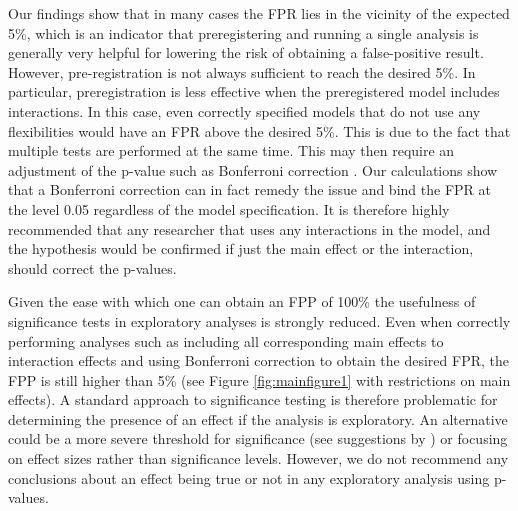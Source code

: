 Our findings show that in many cases the FPR lies in the vicinity of the expected 5\%, which is an indicator that preregistering and running a single analysis is generally very helpful for lowering the risk of obtaining a false-positive result. However, pre-registration is not always sufficient to reach the desired 5\%. In particular, preregistration is less effective when the preregistered model includes interactions. In this case, even correctly specified models that do not use any flexibilities would have an FPR above the desired 5\%. This is due to the fact that multiple tests are performed at the same time. This may then require an adjustment of the p-value such as Bonferroni correction \citep{dunn1961multiple}. Our calculations show that a Bonferroni correction can in fact remedy the issue and bind the FPR at the level 0.05 regardless of the model specification. It is therefore highly recommended that any researcher that uses any interactions in the model, and the hypothesis would be confirmed if just the main effect or the interaction, should correct the p-values.  


Given the ease with which one can obtain an FPP of 100\% the usefulness of significance tests in exploratory analyses is strongly reduced. Even when correctly performing analyses such as including all corresponding main effects to interaction effects and using Bonferroni correction to obtain the desired FPR, the FPP is still higher than 5\% (see Figure \ref{fig:mainfigure1} with restrictions on main effects). A standard approach to significance testing is therefore problematic for determining the presence of an effect if the analysis is exploratory. An alternative could be a more severe threshold for significance (see suggestions by \cite{benjamin2018}) or focusing on effect sizes rather than significance levels. However, we do not recommend any conclusions about an effect being true or not in any exploratory analysis using p-values.  
    
